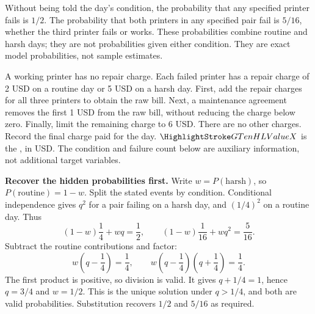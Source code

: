 Without being told the day's condition, the probability that any specified printer fails is $1/2$. The probability that both printers in any specified pair fail is $5/16$, whether the third printer fails or works. These probabilities combine routine and harsh days; they are not probabilities given either condition. They are exact model probabilities, not sample estimates.

A working printer has no repair charge. Each failed printer has a repair charge of 2 USD on a routine day or 5 USD on a harsh day. First, add the repair charges for all three printers to obtain the raw bill. Next, a maintenance agreement removes the first 1 USD from the raw bill, without reducing the charge below zero. Finally, limit the remaining charge to 6 USD. There are no other charges. Record the final charge paid for the day.
$\cTwoValue{X}$ is the , in USD. The condition and failure count below are auxiliary information, not additional target variables.

\textbf{Recover the hidden probabilities first.} Write $w=P(\text{harsh})$, so $P(\text{routine})=1-w$. Split the stated events by condition. Conditional independence gives $q^2$ for a pair failing on a harsh day, and $(1/4)^2$ on a routine day. Thus
\[
(1-w)\frac14+wq=\frac12,\qquad
(1-w)\frac1{16}+wq^2=\frac5{16}.
\]
Subtract the routine contributions and factor:
\[
w\left(q-\frac14\right)=\frac14,\qquad
w\left(q-\frac14\right)\left(q+\frac14\right)=\frac14.
\]
The first product is positive, so division is valid. It gives $q+1/4=1$, hence $q=3/4$ and $w=1/2$. This is the unique solution under $q>1/4$, and both are valid probabilities. Substitution recovers $1/2$ and $5/16$ as required.

